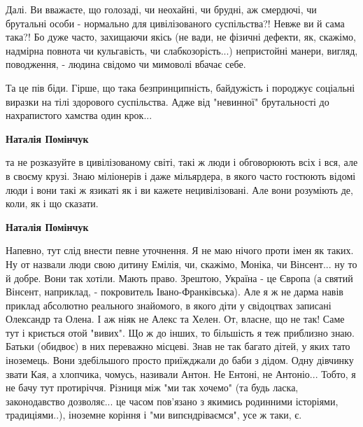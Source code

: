 \begin{itemize}
\begin{itemize}
Далі. Ви вважаєте, що голозаді, чи неохайні, чи брудні, аж смердючі, чи
брутальні особи - нормально для цивілізованого суспільства?! Невже ви й сама
така?! Бо дуже часто, захищаючи якісь (не вади, не фізичні дефекти, як,
скажімо, надмірна повнота чи кульгавість, чи слабкозорість...) непристойні
манери, вигляд, поводження, - людина свідомо чи мимоволі вбачає себе.

Та це пів біди. Гірше, що така безпринципність, байдужість і породжує соціальні
виразки на тілі здорового суспільства. Адже від "невинної" брутальності до
нахрапистого хамства один крок...

 
\textbf{Наталія Помінчук} 

та не розказуйте в цивілізованому світі, такі ж люди і обговорюють всіх і вся,
але в своєму крузі. Знаю міліонерів і даже мільярдера, в якого часто гостюють
відомі люди і вони такі ж язикаті як і ви кажете нецивілізовані. Але вони
розуміють де, коли, як і що сказати.


 
\textbf{Наталія Помінчук} 

Напевно, тут слід внести певне уточнення. Я не маю нічого проти імен як таких.
Ну от назвали люди свою дитину Емілія, чи, скажімо, Моніка, чи Вінсент... ну то
й добре. Вони так хотіли. Мають право. Зрештою, Україна - це Європа (а святий
Вінсент, наприклад, - покровитель Івано-Франківська). Але я ж не дарма навів
приклад абсолютно реального знайомого, в якого діти у свідоцтвах записані
Олександр та Олена. І аж ніяк не Алекс та Хелен. От, власне, що не так! Саме
тут і криється отой "вивих". Що ж до інших, то більшість я теж приблизно знаю.
Батьки (обидвоє) в них переважно місцеві. Знав не так багато дітей, у яких тато
іноземець. Вони здебільшого просто приїжджали до баби з дідом. Одну дівчинку
звати Кая, а хлопчика, чомусь, називали Антон. Не Ентоні, не Антоніо... Тобто,
я не бачу тут протиріччя. Різниця між "ми так хочемо" (та будь ласка,
законодавство дозволяє... це часом пов'язано з якимись родинними історіями,
традиціями..), іноземне коріння і "ми випєндріваємся", усе ж таки, є.


\end{itemize}
\end{itemize}

